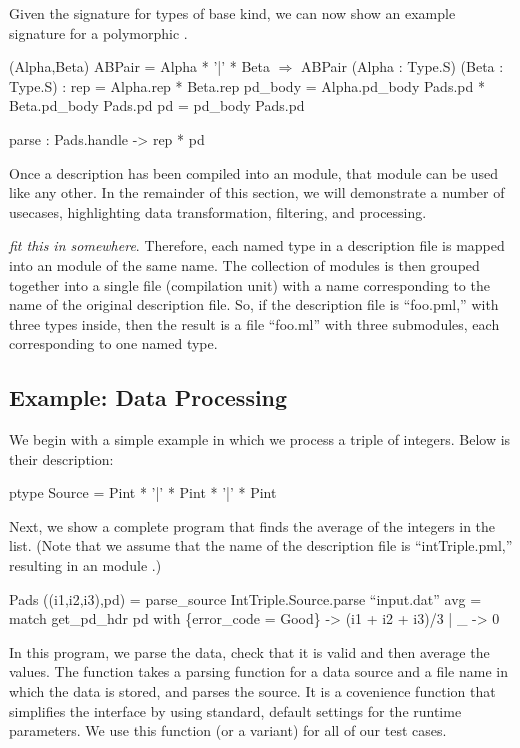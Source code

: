 Given the signature  for types of base kind, we can now
show an example signature for a polymorphic .
\begin{code}\scriptsize
{} (Alpha,Beta) ABPair = Alpha * '|' * Beta
\(\Longrightarrow\)
 ABPair (Alpha : Type.S) (Beta : Type.S) :
   rep = Alpha.rep * Beta.rep
   pd\_body = Alpha.pd\_body Pads.pd * 
                     Beta.pd\_body Pads.pd
   pd = pd\_body Pads.pd

   parse : Pads.handle -> rep * pd
\end{code}

Once a description has been compiled into an \ocaml{} module, that
module can be used like any other. In the remainder of this section,
we will demonstrate a number of usecases, highlighting data transformation,
filtering, and processing.

\emph{fit this in somewhere}.  Therefore, each named type in a
description file is mapped into an \ocaml module of the same name. The
collection of modules is then grouped together into a single file
(compilation unit) with a name corresponding to the name of the
original description file. So, if the description file is ``foo.pml,''
with three types inside, then the result is a file ``foo.ml'' with
three submodules, each corresponding to one named type.

\subsection{Example: Data Processing}
\label{sec:ex-process}

We begin with a simple example in which we process a triple of
integers. Below is their description:
\begin{code}\scriptsize
ptype Source = Pint * '|' * Pint * '|' * Pint\end{code}
Next, we show a complete \ocaml{} program that finds the average of
the integers in the list. (Note that we assume that the
name of the description file is ``intTriple.pml,'' resulting in an
\ocaml{} module .)
\begin{code}\scriptsize
{} Pads
 ((i1,i2,i3),pd) = parse_source IntTriple.Source.parse  ``input.dat''
 avg = match get_pd_hdr pd with
    \{error_code = Good\} -> (i1 + i2 + i3)/3
  | _ -> 0\end{code}

In this program, we parse the data, check that it is valid and then
average the values. The function  takes a parsing
function for a data source and a file name in which the data is
stored, and parses the source. It is a covenience function that
simplifies the \padsml{} interface by using standard, default settings
for the runtime parameters. We use this function (or a variant) for
all of our test cases. 

